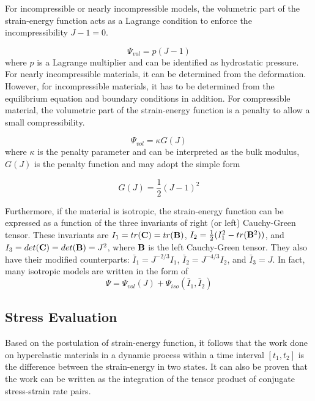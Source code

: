 For incompressible or nearly incompressible models, the volumetric part of the strain-energy function acts as a Lagrange condition to enforce the incompressibility $J -1 = 0$.

\begin{equation} \label{Lagrange}
\Psi_{vol} = p(J-1)
\end{equation} 
where $p$ is a Lagrange multiplier and can be identified as hydrostatic pressure. For nearly incompressible materials, it can be determined from the deformation. However, for incompressible materials, it has to be determined from the equilibrium equation and boundary conditions in addition. For compressible material, the volumetric part of the strain-energy function is a penalty to allow a small compressibility.

\begin{equation} \label{penalty}
\Psi_{vol} = \kappa G(J)
\end{equation}
where $\kappa$ is the penalty parameter and can be interpreted as the bulk modulus, $G(J)$ is the penalty function and may adopt the simple form

\begin{equation} \label{penalty2}
G(J) = \frac{1}{2}(J - 1)^2
\end{equation}

Furthermore, if the material is isotropic, the strain-energy function can be expressed as a function of the three invariants of right (or left) Cauchy-Green tensor. 
These invariants are 
$I_1 = tr(\bold{C}) = tr(\bold{B})$, $I_2 = \frac{1}{2}(I_1^2 - tr(\bold{B}^2))$, and $I_3 = det(\bold{C}) = det(\bold{B}) = J^2$, where $\bold{B}$ is the left Cauchy-Green tensor. 
They also have their modified counterparts: $\bar{I}_1 = J^{-2/3}I_1$, $\bar{I}_2 = J^{-4/3}I_2$, and $\bar{I}_3 = J$. In fact, many isotropic models are written in the form of
\begin{equation}
\Psi = \Psi_{vol}(J) + \Psi_{iso}(\bar{I}_1, \bar{I}_2)
\end{equation}


%
\subsection{Stress Evaluation} \label{general_stress}
Based on the postulation of strain-energy function, it follows that the work done on hyperelastic materials in a dynamic process within a time interval $[t_1, t_2]$ is the difference between the strain-energy in two states. It can also be proven that the work can be written as the integration of the tensor product of conjugate stress-strain rate pairs.

